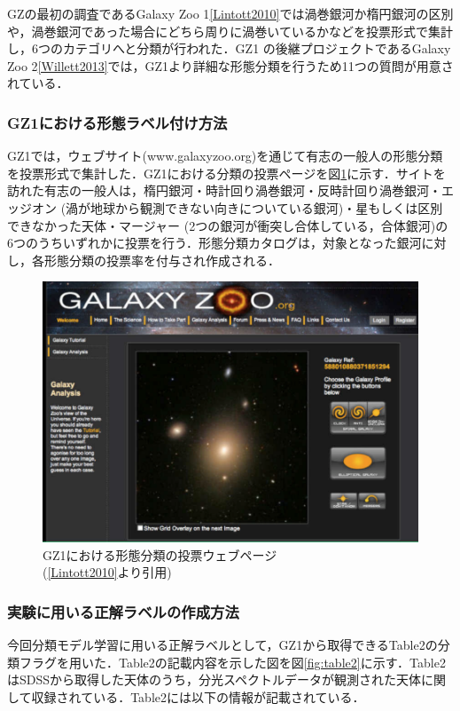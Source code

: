 \documentclass[a4j, 11pt]{jarticle}
\begin{document}
GZの最初の調査であるGalaxy Zoo 1\ref{Lintott2010}では渦巻銀河か楕円銀河の区別や，渦巻銀河であった場合にどちら周りに渦巻いているかなどを投票形式で集計し，6つのカテゴリへと分類が行われた．GZ1 の後継プロジェクトであるGalaxy Zoo 2\ref{Willett2013}では，GZ1より詳細な形態分類を行うため11つの質問が用意されている．

\subsubsection*{GZ1における形態ラベル付け方法}
GZ1では，ウェブサイト(www.galaxyzoo.org)を通じて有志の一般人の形態分類を投票形式で集計した．GZ1における分類の投票ページを図\ref{fig:gz1_website}に示す．サイトを訪れた有志の一般人は，楕円銀河・時計回り渦巻銀河・反時計回り渦巻銀河・エッジオン (渦が地球から観測できない向きについている銀河)・星もしくは区別できなかった天体・マージャー (2つの銀河が衝突し合体している，合体銀河)の6つのうちいずれかに投票を行う．形態分類カタログは，対象となった銀河に対し，各形態分類の投票率を付与され作成される．

\begin{figure}[h]
 \centering
 \includegraphics[width=12cm]{images/gz1_website.png}
 \caption{GZ1における形態分類の投票ウェブページ\\(\ref{Lintott2010}より引用)}
 \label{fig:gz1_website}
\end{figure}

\subsubsection*{実験に用いる正解ラベルの作成方法}
今回分類モデル学習に用いる正解ラベルとして，GZ1から取得できるTable2の分類フラグを用いた．Table2の記載内容を示した図を図\ref{fig:table2}に示す．Table2はSDSSから取得した天体のうち，分光スペクトルデータが観測された天体に関して収録されている．Table2には以下の情報が記載されている．
\end{document}
